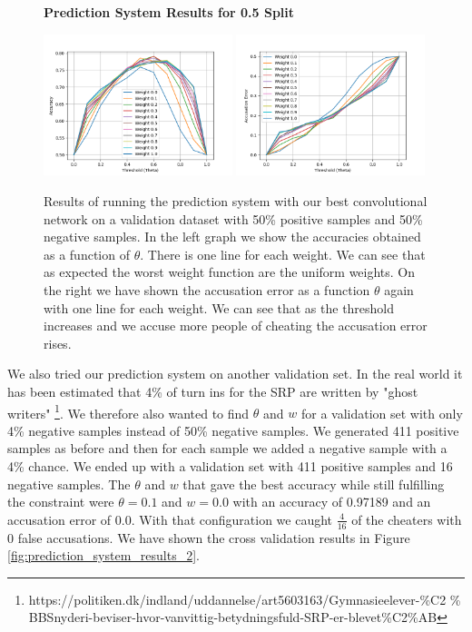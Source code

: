 \begin{figure}
    \centering
    \textbf{Prediction System Results for 0.5 Split}\par\medskip
    \includegraphics[width=0.49\textwidth]{./pictures/experiments/network3_prediction_system_accuracies.png}
    \includegraphics[width=0.49\textwidth]{./pictures/experiments/network3_prediction_system_accusation_error.png}
    \caption{Results of running the prediction system with our best
        convolutional network on a validation dataset with 50\% positive samples
        and 50\% negative samples. In the left graph we show the accuracies
        obtained as a function of $\theta$. There is one line for each weight.
        We can see that as expected the worst weight function are the uniform
        weights. On the right we have shown the accusation error as a function
        $\theta$ again with one line for each weight. We can see that as the
        threshold increases and we accuse more people of cheating the accusation
        error rises.}
    \label{fig:prediction_system_results_1}
\end{figure}

We also tried our prediction system on another validation
set. In the real world it has been estimated that 4\% of
turn ins for the \gls{SRP} are written by "ghost writers"
\footnote{https://politiken.dk/indland/uddannelse/art5603163/Gymnasieelever-\%C2
\% BBSnyderi-beviser-hvor-vanvittig-betydningsfuld-SRP-er-blevet\%C2\%AB}. We
therefore also wanted to find $\theta$ and $w$ for a validation set with only
4\% negative samples instead of 50\% negative samples. We generated 411 positive
samples as before and then for each sample we added a negative sample with a
4\% chance. We ended up with a validation set with 411 positive samples and 16
negative samples. The $\theta$ and $w$ that gave the best accuracy while still
fulfilling the constraint were $\theta = 0.1$ and $w = 0.0$ with an accuracy
of 0.97189 and an accusation error of 0.0. With that configuration we caught
$\frac{4}{16}$ of the cheaters with 0 false accusations. We have shown the cross
validation results in Figure \ref{fig:prediction_system_results_2}.

